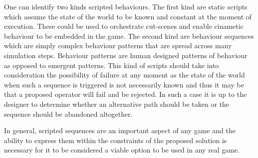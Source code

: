 One can identify two kinds scripted behaviours.
The first kind are static scripts which assume the state of the world to be known and constant at the moment of execution.
These could be used to orchestrate cut-scenes and enable cinametic behaviour to be embedded in the game.
The second kind are behaviour sequences which are simply complex behaviour patterns that are spread across many simulation steps.
Behaviour patterns are human designed patterns of behaviour as opposed to emergent patterns.
This kind of scripts should take into consideration the possibility of failure at any moment as the state of the world when such a sequence is triggered is not necessarily known and thus it may be that a proposed operator will fail and be rejected.
In such a case it is up to the designer to determine whether an alternative path should be taken or the sequence should be abandoned altogether.

In general, scripted sequences are an important aspect of any game and the ability to express them within the constraints of the proposed solution is necessary for it to be considered a viable option to be used in any real game.